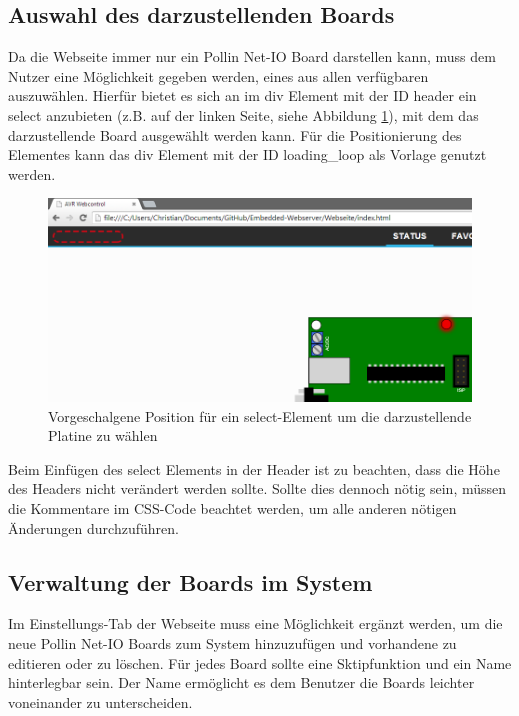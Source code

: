 \subsection{Auswahl des darzustellenden Boards}
\label{auswahl_board}
Da die Webseite immer nur ein Pollin Net-IO Board darstellen kann, muss dem
Nutzer eine Möglichkeit gegeben werden, eines aus allen verfügbaren auszuwählen.
Hierfür bietet es sich an im \textrm{div} Element mit der ID \textrm{header}
ein \textrm{select} anzubieten (z.B. auf der linken Seite, siehe
Abbildung \ref{select_board}), mit dem das darzustellende Board ausgewählt
werden kann.
Für die Positionierung des Elementes kann das \textrm{div} Element mit der ID
\textrm{loading\_loop} als Vorlage genutzt werden.

\begin{figure}[H]
\centering
\includegraphics[width=13cm]{content/pictures/select_board.png}
\caption[Select Element]{Vorgeschalgene Position für ein select-Element um die
darzustellende Platine zu wählen}
\label{select_board}
\end{figure}

Beim Einfügen des \textrm{select} Elements in der Header ist zu beachten, dass die
Höhe des Headers nicht verändert werden sollte. Sollte dies dennoch nötig sein,
müssen die Kommentare im CSS-Code beachtet werden, um alle anderen nötigen
Änderungen durchzuführen.

\subsection{Verwaltung der Boards im System}
\label{verwaltung_system}
Im Einstellungs-Tab der Webseite muss eine Möglichkeit ergänzt werden, um die
neue Pollin Net-IO Boards zum System hinzuzufügen und vorhandene zu editieren
oder zu löschen. Für jedes Board sollte eine Sktipfunktion und ein Name
hinterlegbar sein. Der Name ermöglicht es dem Benutzer die Boards leichter
voneinander zu unterscheiden.

